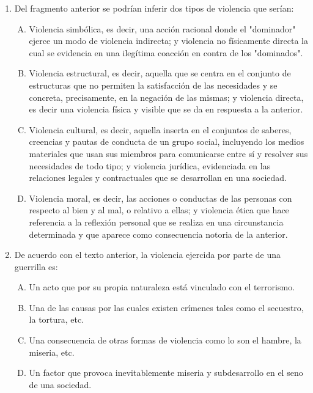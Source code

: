 \begin{enumerate}
\newpage


\item Del fragmento anterior se podrían inferir dos tipos de violencia que serían:\label{sociii-7}


\begin{enumerate}[(A)]
\item   Violencia simbólica, es decir, una acción racional donde el "dominador" ejerce un modo de violencia indirecta; y violencia no físicamente directa la cual se evidencia en una ilegítima coacción en contra de los "dominados".
 \item  Violencia estructural, es decir, aquella que se centra en el conjunto de estructuras que no permiten la satisfacción de las necesidades y se concreta, precisamente, en la negación de las mismas; y violencia directa, es decir una violencia física y visible que se da en respuesta a la anterior.
\item Violencia cultural, es decir, aquella inserta en el conjuntos de saberes, creencias y pautas de conducta de un grupo social, incluyendo los medios materiales que usan sus miembros para comunicarse entre sí y resolver sus necesidades de todo tipo; y violencia jurídica, evidenciada en las relaciones legales y contractuales que se desarrollan en una sociedad.
\item Violencia moral, es decir, las acciones o conductas de las personas con respecto al bien y al mal, o relativo a ellas; y violencia ética que hace referencia a la reflexión personal que se realiza en una circunstancia determinada y que aparece como consecuencia notoria de la anterior.
\end{enumerate}

\newpage
\item De acuerdo con el texto anterior, la violencia ejercida por parte de una guerrilla es:\label{sociii-6}


\begin{enumerate}[(A)]
\item   Un acto que por su propia naturaleza está vinculado con el terrorismo.
 \item  Una de las causas por las cuales existen crímenes tales como el secuestro, la tortura, etc.
\item Una consecuencia de otras formas de violencia como lo son el hambre, la miseria, etc.
\item Un factor que provoca inevitablemente miseria y subdesarrollo en el seno de una sociedad.
\end{enumerate}



\end{enumerate}
